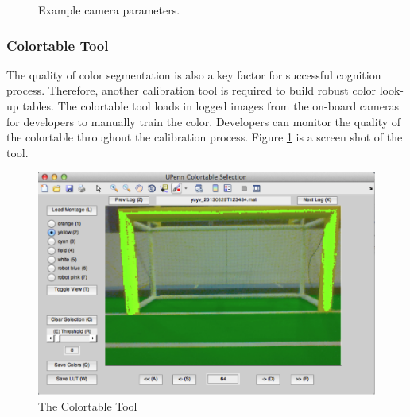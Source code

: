 \documentclass{article}
\begin{document}
	\begin{figure}[H]
    		\centering
		\quad
		\quad
    		\caption{Example camera parameters.}	
	\end{figure}

\subsubsection{Colortable Tool}
	The quality of color segmentation is also a key factor for successful cognition process. Therefore, another calibration tool is required to build robust color look-up tables. The colortable tool loads in logged images from the on-board cameras for developers to manually train the color. Developers can monitor the quality of the colortable throughout the calibration process. Figure \ref{fig:colortable} is a screen shot of the tool.

	\begin{figure}[H]
		\centering
		\includegraphics[width=.6\textwidth]{figures/ColorSelectionTool.png}
		\caption{The Colortable Tool}
		\label{fig:colortable}
	\end{figure}
\end{document}
